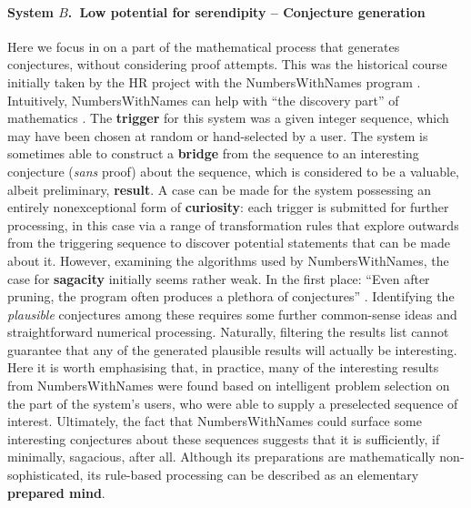 \paragraph{System $B$.~Low potential for serendipity -- Conjecture generation}

Here we focus in on a part of the mathematical process that generates
conjectures, without considering proof attempts.  This was the
historical course initially taken by the {\sf HR} project with the
{\sf NumbersWithNames} program \cite{colton2002numberswithnames}.
Intuitively, {\sf NumbersWithNames} can help with ``the discovery
part'' of mathematics \cite[p.~7]{colton2002numberswithnames}.
The \textbf{trigger} for this system was a given integer sequence,
which may have been chosen at random or hand-selected by a user.  The system is sometimes able to construct a \textbf{bridge} from the sequence to an
interesting conjecture (\emph{sans} proof) about the sequence, which is
considered to be a valuable, albeit preliminary, \textbf{result}.  A
case can be made for the system possessing an entirely nonexceptional form of
\textbf{curiosity}: each trigger is submitted for further processing,
in this case via a range of transformation rules that explore outwards
from the triggering sequence to discover potential statements that can
be made about it.  However, examining the algorithms used by {\sf
  NumbersWithNames}, the case for \textbf{sagacity} initially seems
rather weak.  In the first place: ``Even after pruning, the program
often produces a plethora of conjectures''
\cite[p.~4]{colton2002numberswithnames}.  Identifying the
\emph{plausible} conjectures among these requires some further
common-sense ideas and straightforward numerical processing.
Naturally, filtering the results list cannot guarantee that any of the
generated plausible results will actually be interesting.  Here it is
worth emphasising that, in practice, many of the interesting results
from {\sf NumbersWithNames} were found based on intelligent problem
selection on the part of the system's users, who were able to supply
a preselected sequence of interest.  Ultimately, the fact that {\sf
  NumbersWithNames} could surface some interesting conjectures about these
sequences suggests that it is sufficiently, if minimally, sagacious,
after all.  Although its preparations are mathematically non-sophisticated, its rule-based processing can be described as an elementary
\textbf{prepared mind}.

